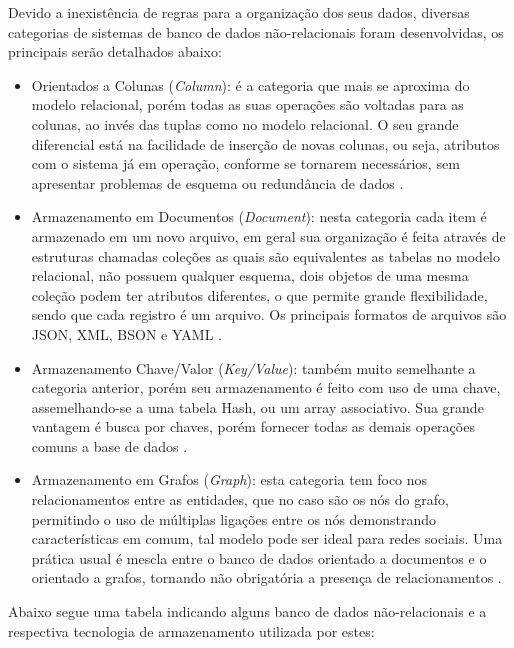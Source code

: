 Devido a inexistência de regras para a organização dos seus dados, diversas categorias de sistemas de banco de dados não-relacionais foram desenvolvidas, os principais serão detalhados abaixo:

\begin{itemize}
\item Orientados a Colunas (\textit{Column}): é a categoria que mais se aproxima do modelo relacional, porém todas as suas operações são voltadas para as colunas, ao invés das tuplas como no modelo relacional. O seu grande diferencial está na facilidade de inserção de novas colunas, ou seja, atributos com o sistema já em operação, conforme se tornarem necessários, sem apresentar problemas de esquema ou redundância de dados \cite{vaish2013getting}.

\item Armazenamento em Documentos (\textit{Document}): nesta categoria cada item é armazenado em um novo arquivo, em geral sua organização é feita através de estruturas chamadas coleções as quais são equivalentes as tabelas no modelo relacional, não possuem qualquer esquema, dois objetos de uma mesma coleção podem ter atributos diferentes, o que permite grande flexibilidade, sendo que cada registro é um arquivo. Os principais formatos de arquivos são JSON, XML, BSON e YAML \cite{vaish2013getting}.

\item Armazenamento Chave/Valor (\textit{Key/Value}): também muito semelhante a categoria anterior, porém seu armazenamento é feito com uso de uma chave, assemelhando-se a uma tabela Hash, ou um array associativo. Sua grande vantagem é busca por chaves, porém fornecer todas as demais operações comuns a base de dados \cite{vaish2013getting}.

\item Armazenamento em Grafos (\textit{Graph}): esta categoria tem foco nos relacionamentos entre as entidades, que no caso são os nós do grafo, permitindo o uso de múltiplas ligações entre os nós demonstrando características em comum, tal modelo pode ser ideal para redes sociais. Uma prática usual é mescla entre o banco de dados orientado a documentos e o orientado a grafos, tornando não obrigatória a presença de relacionamentos \cite{vaish2013getting}.

\end{itemize}

Abaixo segue uma tabela indicando alguns banco de dados não-relacionais e a respectiva tecnologia de armazenamento utilizada por estes:

